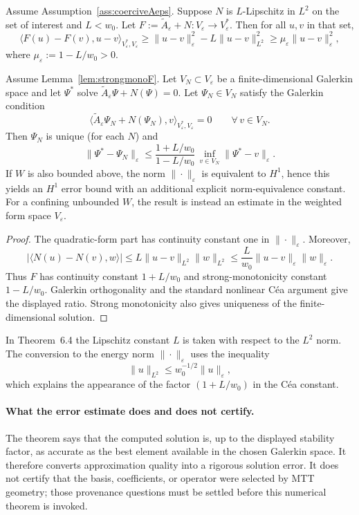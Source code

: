 \documentclass[11pt]{article}
\begin{document}
\begin{lemma}\label{lem:strongmonoF}
Assume Assumption~\ref{ass:coerciveAeps}. Suppose $N$ is $L$-Lipschitz in $L^2$ on the set of interest and $L<w_0$.
Let $F:=\widetilde A_\varepsilon+N:V_\varepsilon\to
V_\varepsilon^\ast$. Then for all $u,v$ in that set,
\[
\langle F(u)-F(v),u-v\rangle_{V_\varepsilon^\ast,V_\varepsilon}
\ge \|u-v\|_\varepsilon^2-L\|u-v\|_{L^2}^2
\ge \mu_\varepsilon \|u-v\|_{\varepsilon}^2,
\]
where $\mu_\varepsilon := 1-L/w_0>0$.
\end{lemma}
\begin{theorem}\label{thm:cea}
Assume Lemma~\ref{lem:strongmonoF}. Let $V_N\subset V_\varepsilon$ be a finite-dimensional Galerkin space and let
$\Psi^\ast$ solve $\widetilde A_\varepsilon\Psi + N(\Psi)=0$.
Let $\Psi_N\in V_N$ satisfy the Galerkin condition
\[
\langle \widetilde A_\varepsilon\Psi_N+N(\Psi_N),v
\rangle_{V_\varepsilon^\ast,V_\varepsilon}=0
\qquad\forall\,v\in V_N.
\]
Then $\Psi_N$ is unique (for each $N$) and
\[
\|\Psi^\ast-\Psi_N\|_{\varepsilon}
\le
\frac{1+L/w_0}{1-L/w_0}\,
\inf_{v\in V_N}\|\Psi^\ast-v\|_{\varepsilon}.
\]
If $W$ is also bounded above, the norm $\|\cdot\|_{\varepsilon}$ is
equivalent to $H^1$, hence this yields an $H^1$ error bound with an additional
explicit norm-equivalence constant. For a confining unbounded $W$, the result
is instead an estimate in the weighted form space $V_\varepsilon$.
\end{theorem}
\begin{proof}
The quadratic-form part has continuity constant one in
$\|\cdot\|_\varepsilon$. Moreover,
\[
|\langle N(u)-N(v),w\rangle|
\le L\|u-v\|_{L^2}\|w\|_{L^2}
\le \frac{L}{w_0}\|u-v\|_\varepsilon\|w\|_\varepsilon.
\]
Thus $F$ has continuity constant $1+L/w_0$ and strong-monotonicity
constant $1-L/w_0$. Galerkin orthogonality and the standard nonlinear
C\'ea argument give the displayed ratio. Strong monotonicity also gives
uniqueness of the finite-dimensional solution.
\end{proof}
\begin{remark}
In Theorem~6.4 the Lipschitz constant $L$ is taken with respect to the $L^2$ norm.
The conversion to the energy norm $\|\cdot\|_\varepsilon$ uses the inequality
\[
\|u\|_{L^2}\le w_0^{-1/2}\|u\|_\varepsilon,
\]
which explains the appearance of the factor $(1+L/w_0)$ in the C\'ea constant.
\end{remark}

\paragraph{What the error estimate does and does not certify.}
The theorem says that the computed solution is, up to the displayed stability
factor, as accurate as the best element available in the chosen Galerkin
space.  It therefore converts approximation quality into a rigorous solution
error.  It does not certify that the basis, coefficients, or operator were
selected by MTT geometry; those provenance questions must be settled before
this numerical theorem is invoked.
\end{document}
